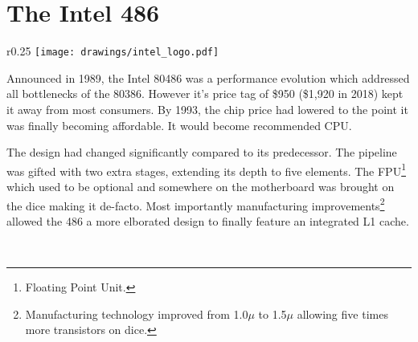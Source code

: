 \section{The Intel 486}

\begin{wrapfigure}[5]{r}{0.25\textwidth}
\centering
\texttt{[image: drawings/intel\_logo.pdf]}
\end{wrapfigure}

Announced in 1989, the Intel 80486 was a performance evolution which addressed all bottlenecks of the 80386. However it's price tag of \$950 (\$1,920 in 2018) kept it away from most consumers. By 1993, the chip price had lowered to the point it was finally becoming affordable. It would become \doom{}recommended CPU.\\
\par
The design had changed significantly compared to its predecessor. The pipeline was gifted with two extra stages, extending its depth to five elements. The FPU\footnote{Floating Point Unit.} which used to be optional and somewhere on the motherboard was brought on the dice making it de-facto. Most importantly manufacturing improvements\footnote{Manufacturing technology improved from 1.0$\mu$ to 1.5$\mu$ allowing five times more transistors on dice.} allowed the 486 a more elborated design to finally feature an integrated L1 cache.\\
\par
{}\\
\par

